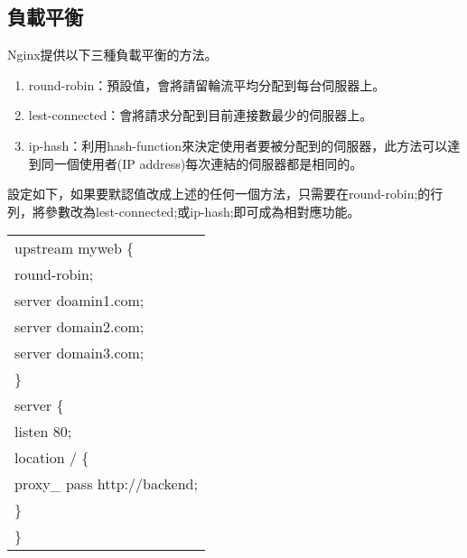 \renewcommand{\baselinestretch}{20} %
\subsection{負載平衡}
\par
\renewcommand{\baselinestretch}{1} %
\twelve \qquad Nginx提供以下三種負載平衡的方法。
\begin{enumerate}
	\item round-robin：預設值，會將請留輪流平均分配到每台伺服器上。
	\item lest-connected：會將請求分配到目前連接數最少的伺服器上。
	\item ip-hash：利用hash-function來決定使用者要被分配到的伺服器，此方法可以達到同一個使用者(IP address)每次連結的伺服器都是相同的。
\\
\end{enumerate}
\par
\renewcommand{\baselinestretch}{1} %
\twelve \hspace{0.5em} 設定如下，如果要默認值改成上述的任何一個方法，只需要在round-robin;的行列，將參數改為lest-connected;或ip-hash;即可成為相對應功能。
\par
\begin{center}
\begin{tabular}{||p{15cm}|} %
\hline
upstream myweb \{
\\
\qquad round-robin;
\\
\qquad server doamin1.com;
\\
\qquad server domain2.com;
\\
\qquad server domain3.com;
\\
\}
\\
server \{
\\
\qquad listen 80;
\\
\qquad location / \{
\\
\qquad \quad proxy\_ pass \quad http://backend;
\\
\quad \}
\\
\}
\\
\hline
\end{tabular}
\end{center}
\par

\renewcommand{\baselinestretch}{20} %
